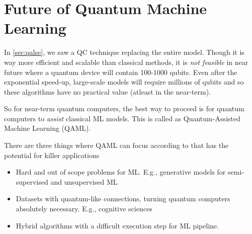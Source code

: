 \section{Future of Quantum Machine Learning}
In \ref{sec:qalse}, we saw a QC technique replacing the entire model. Though it is way more efficient and scalable than classical methods, it is \emph{not feasible} in near future where a quantum device will contain 100-1000 qubits. Even after the exponential speed-up, large-scale models will require millions of qubits and so these algorithms have no practical value (atleast in the near-term).

So for near-term quantum computers, the best way to proceed is for quantum computers to \emph{assist} classical ML models. This is called as Quantum-Assisted Machine Learning (QAML).

There are three things where QAML can focus according to \cite{Perdomo_Ortiz_2018} that has the potential for killer applications
\begin{itemize}
\item Hard and out of scope problems for ML. E.g., generative models for semi-supervised and unsupervised ML
\item Datasets with quantum-like connections, turning quantum computers absolutely necessary. E.g., cognitive sciences
\item Hybrid algorithms with a difficult execution step for ML pipeline.
\end{itemize}